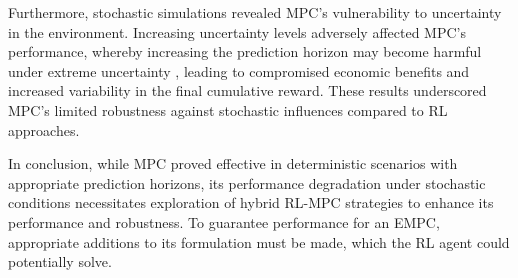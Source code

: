 Furthermore, stochastic simulations revealed MPC's vulnerability to uncertainty in the environment. Increasing uncertainty levels adversely affected MPC's performance, whereby increasing the prediction horizon may become harmful under extreme uncertainty , leading to compromised economic benefits and increased variability in the final cumulative reward. These results underscored MPC's limited robustness against stochastic influences compared to RL approaches.

In conclusion, while MPC proved effective in deterministic scenarios with appropriate prediction horizons, its performance degradation under stochastic conditions necessitates exploration of hybrid RL-MPC strategies to enhance its performance and robustness. To guarantee performance for an EMPC, appropriate additions to its formulation must be made, which the RL agent could potentially solve.

